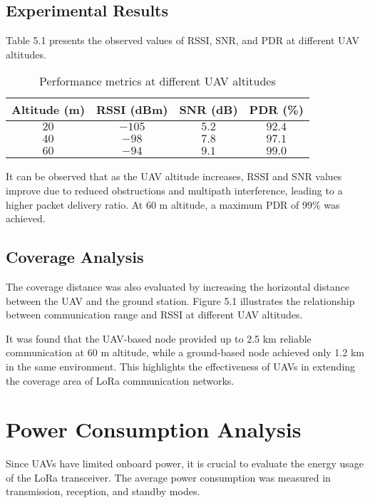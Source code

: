 \subsection{Experimental Results}
Table 5.1 presents the observed values of RSSI, SNR, and PDR at different UAV altitudes.

\begin{table}[htbp]
    \begin{center}
    \begin{tabular}{c|c|c|c}
      \hline \textbf{Altitude (m)}   &  \textbf{RSSI (dBm)}&\textbf{SNR (dB)}&\textbf{PDR (\%)}\\
      \hline 
      \hline
        $20$ & $-105$ & $5.2$ & $92.4$ \\[7pt]
        $40$ & $-98$ & $7.8$ & $97.1$ \\[7pt]
        $60$ & $-94$ & $9.1$ & $99.0$ \\[7pt]
      \hline
    \end{tabular}  
    \caption{Performance metrics at different UAV altitudes}
    \end{center}
    \label{tab:results} 
\end{table}

It can be observed that as the UAV altitude increases, RSSI and SNR values improve due to reduced obstructions and multipath interference, leading to a higher packet delivery ratio. At 60 m altitude, a maximum PDR of 99\% was achieved.

\subsection{Coverage Analysis}
The coverage distance was also evaluated by increasing the horizontal distance between the UAV and the ground station. Figure 5.1 illustrates the relationship between communication range and RSSI at different UAV altitudes.  

It was found that the UAV-based node provided up to 2.5 km reliable communication at 60 m altitude, while a ground-based node achieved only 1.2 km in the same environment. This highlights the effectiveness of UAVs in extending the coverage area of LoRa communication networks.

\section{Power Consumption Analysis}
Since UAVs have limited onboard power, it is crucial to evaluate the energy usage of the LoRa transceiver. The average power consumption was measured in transmission, reception, and standby modes.

